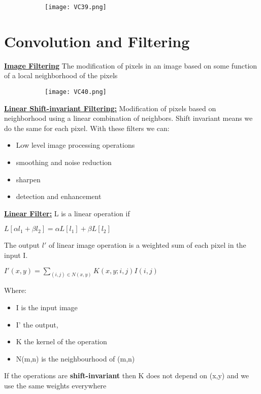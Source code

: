 \documentclass[8pt]{extreport}
\begin{document}
\begin{figure}[H]
\centering
\begin{subfigure}[b]{0.32\linewidth}
\texttt{[image: VC39.png]}
\end{subfigure}
\end{figure}

\chapter{Convolution and Filtering}


\underline{\textbf{Image Filtering}} The modification of pixels in an image based on some function of a local neighborhood of the pixels
\begin{figure}[H]
\centering
\begin{subfigure}[b]{0.32\linewidth}
\texttt{[image: VC40.png]}
\end{subfigure}
\end{figure}


\underline{\textbf{Linear Shift-invariant Filtering:}} Modification of pixels based on neighborhood using a linear combination of neighbors. Shift invariant means we do the same for each pixel. With these filters we can:
\begin{itemize}
\item Low level image processing operations
\item smoothing and noise reduction
\item sharpen
\item detection and enhancement
\end{itemize}

\underline{\textbf{Linear Filter:}} L is a linear operation if
\begin{center}
$L[\alpha l_1 + \beta l_2] = \alpha L[l_1] + \beta L[l_2]$
\end{center}
The output $l'$ of linear image operation is a weighted sum of each pixel in the input I.
\begin{center}
$I'(x,y) = \displaystyle\sum_{(i,j) \in N(x,y)} K(x,y;i,j)I(i,j)$
\end{center}
Where:
\begin{itemize}
\item I is the input image
\item I' the output,
\item K the kernel of the operation
\item N(m,n) is the neighbourhood of (m,n)
\end{itemize}
If  the operations are \textbf{shift-invariant} then K does not depend on  (x,y) and we use the same weights everywhere
\end{document}
